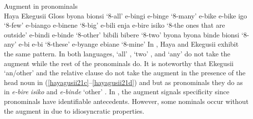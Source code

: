\documentclass[output=paper]{langscibook}
\begin{document}
\ea Augment in pronominals\smallskip\\
\label{hayagusii23}
              \hphantom{abc }Haya			\hspace{1ex}\hphantom{a byona}Ekegusii 		\hphantom{ons}Gloss
  \ea\label{hayagusii23a} byona\hphantom{ibyona}\hspace{1ex}			bionsi\hphantom{bande}			‘8-all’
  \ex\label{hayagusii23b} 	e-bingi\hphantom{byont}\hspace{1ex}			e-binge\hphantom{onsa}			‘8-many’
  \ex\label{hayagusii23c}	e-bike\hphantom{ byona}\hspace{1ex}			e-bike igo\hphantom{aa} 		‘8-few’
  \ex\label{hayagusii23d}	e-biango\hphantom{ttnp}\hspace{1ex} 		e-binene\hphantom{naa}		‘8-big’
  \ex\label{hayagusii23e}	e-bili enja\hphantom{ipa}\hspace{1ex}		e-bire isiko\hphantom{a} 		‘8-the ones that are outside’
  \ex\label{hayagusii23f}	e-bindi\hphantom{byont}\hspace{1ex}		 	e-binde\hphantom{ionsi}			‘8-other’
  \ex\label{hayagusii23g}	bibili\hphantom{a byona}\hspace{1ex}			bibere\hphantom{bionsi}			‘8-two’
  \ex\label{hayagusii23h}	byona byona\hspace{1ex}		binde bionsi 		‘8-any’
  \ex\label{hayagusii23i}	e-bi\hphantom{na byona}\hspace{1ex}			e-bi\hphantom{ie bionsi}			‘8-these’
  \ex\label{hayagusii23j}	e-byange\hphantom{ona}\hspace{1ex}		ebiane\hphantom{iionsi}			‘8-mine’
  \z
\z
In , Haya and Ekegusii exhibit the same pattern. In both languages, ‘all’ , ‘two’ , and ‘any’  do not take the augment while the rest of the pronominals do. It is noteworthy that Ekegusii ‘an/other’ and the relative clause do not take the augment in the presence of the head noun in (\ref{hayagusii21c}--\ref{hayagusii21d}) and  but as pronominals they do as in \textit{e-bire} \textit{isiko}  and \textit{e-binde} ‘other’ . In , the augment signals specificity since pronominals have identifiable antecedents. However, some nominals occur without the augment in  due to idiosyncratic properties.
\end{document}

